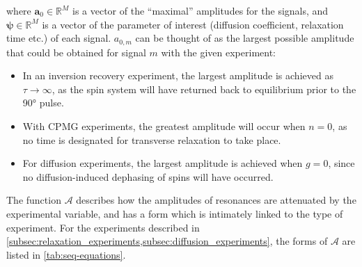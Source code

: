 where $\symbf{a}_0 \in \mathbb{R}^{M}$ is a vector of the ``maximal''
amplitudes for the signals, and $\symbf{\psi} \in \mathbb{R}^M$ is a vector
of the parameter of interest (diffusion coefficient, relaxation time etc.) of
each signal. $a_{0,m}$ can be thought of as the largest
possible amplitude that could be obtained for signal $m$ with the given
experiment:
\begin{itemize}
    \item In an inversion recovery experiment, the largest amplitude is
        achieved as $\tau \rightarrow \infty$, as the spin system will have
        returned back to equilibrium prior to the \ang{90} pulse.
    \item With \ac{CPMG} experiments, the greatest amplitude will occur when
        $n = 0$, as no time is designated for transverse
        relaxation to take place.
    \item For diffusion experiments, the largest amplitude is achieved when
        $g=0$, since no diffusion-induced dephasing of spins will have
        occurred.
\end{itemize}
The function $\mathcal{A}$ describes how the amplitudes of resonances are
attenuated by the experimental variable, and has a form which is intimately
linked to the type of experiment. For the experiments described in
\cref{subsec:relaxation_experiments,subsec:diffusion_experiments},
the forms of $\mathcal{A}$ are listed in \cref{tab:seq-equations}.
